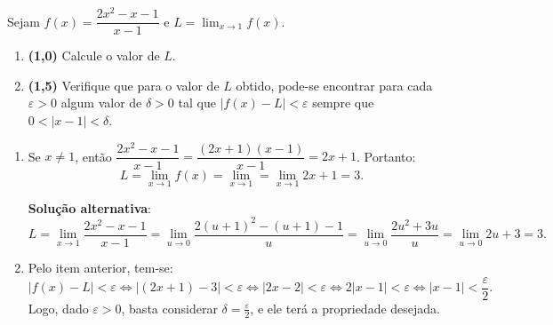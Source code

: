 \documentclass[12pt,a4paper]{article}
\begin{document}
\begin{ExerciseList}
\Exercise[title={2,5}] Sejam $f(x) = \dfrac{2x^2-x-1}{x-1}$ e $\displaystyle L = \lim_{x \to 1} f(x)$.
\begin{enumerate}
\item \textbf{(1,0)} Calcule o valor de $L$.
\item \textbf{(1,5)} Verifique que para o valor de $L$ obtido, pode-se encontrar para cada $\varepsilon > 0$ algum valor de $\delta > 0$ tal que
$|f(x) - L| < \varepsilon$ sempre que $0 < |x-1| < \delta$.
\end{enumerate}
\Answer
\begin{enumerate}
\item Se $x \neq 1$, então $\dfrac{2x^2-x-1}{x-1} = \dfrac{(2x+1)(x-1)}{x-1} = 2x+1$. Portanto:
\[
L = \lim_{x \to 1} f(x) = \lim_{x \to 1} = \lim_{x \to 1} 2x+1 = 3.
\]

\textbf{Solução alternativa}:
\[
L = \lim_{x \to 1} \dfrac{2x^2-x-1}{x-1}
  = \lim_{u \to 0} \dfrac{2(u+1)^2-(u+1)-1}{u}
  = \lim_{u \to 0} \dfrac{2u^2 + 3u}{u}
  = \lim_{u \to 0} 2u+3 = 3.
\]

\item Pelo item anterior, tem-se:
\[
|f(x) - L| < \varepsilon
\Leftrightarrow \left|(2x+1) - 3 \right| < \varepsilon
\Leftrightarrow |2x-2| < \varepsilon
\Leftrightarrow 2|x-1| < \varepsilon
\Leftrightarrow |x-1| < \frac{\varepsilon}{2}.
\]
Logo, dado $\varepsilon > 0$, basta considerar $\delta = \frac{ \varepsilon}{2}$, e ele terá a propriedade desejada.

\end{enumerate}


\end{ExerciseList}
\end{document}
